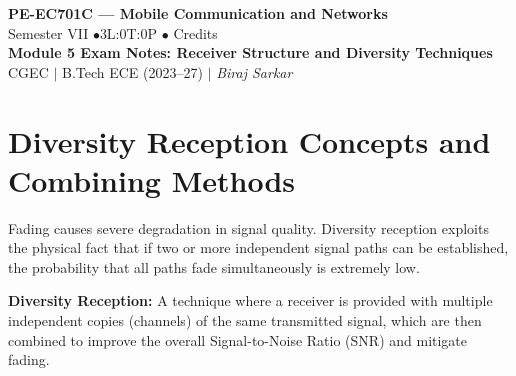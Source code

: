 \documentclass[12pt,a4paper]{article}
\begin{document}

\begin{center}
  {\LARGE\bfseries\color{myred} PE-EC701C --- Mobile Communication and Networks}\\[5pt]
  {\normalsize\color{mydark} Semester VII \quad$\bullet$\quad 3L:0T:0P \quad$\bullet$ Credits}\\[3pt]
  {\normalsize\color{myteal}\textbf{Module 5 Exam Notes: Receiver Structure and Diversity Techniques}}\\[3pt]
  {\small\color{mydark} CGEC \;$|$\; B.Tech ECE (2023--27) \;$|$\; \textit{Biraj Sarkar}}
\end{center}
\noindent{\color{myred}\rule{\linewidth}{1.5pt}}
\vspace{2pt}

\hypersetup{linkcolor=mydark}
\tableofcontents
\hypersetup{linkcolor=myteal}
\newpage

\section{Diversity Reception Concepts and Combining Methods}

Fading causes severe degradation in signal quality. Diversity reception exploits the physical fact that if two or more independent signal paths can be established, the probability that all paths fade simultaneously is extremely low.

\begin{tcolorbox}[defbox]
\textbf{Diversity Reception:} A technique where a receiver is provided with multiple independent copies (channels) of the same transmitted signal, which are then combined to improve the overall Signal-to-Noise Ratio (SNR) and mitigate fading.
\end{tcolorbox}
\end{document}
